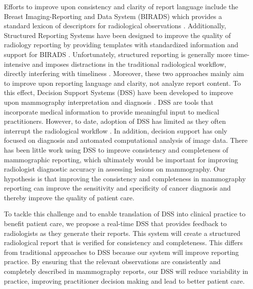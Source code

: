 Efforts to improve upon consistency and clarity of report language include the Breast Imaging-Reporting and Data System (BIRADS) which provides a standard lexicon of descriptors for radiological observations \cite{Liberman:ws}. Additionally, Structured Reporting Systems have been designed to improve the quality of radiology reporting by providing templates with standardized information and support for BIRADS \cite{Reiner:2009ib}. Unfortunately, structured reporting is generally more time-intensive and imposes distractions in the traditional radiological workflow, directly interfering with timeliness \cite{Weiss:2008er}. Moreover, these two approaches mainly aim to improve upon reporting language and clarity, not analyze report content. To this effect, Decision Support Systems (DSS) have been developed to improve upon mammography interpretation and diagnosis \cite{Garg:2005cb, Burnside:2000wl, ElizabethS:2005gc, Rubin:2005jg}. DSS are tools that incorporate medical information to provide meaningful input to medical practitioners. However, to date, adoption of DSS has limited as they often interrupt the radiological workflow \cite{Morgan:2011ct}. In addition, decision support has only focused on diagnosis and automated computational analysis of image data. There has been little work using DSS to improve consistency and completeness of mammographic reporting, which ultimately would be important for improving radiologist diagnostic accuracy in assessing lesions on mammography. Our hypothesis is that improving the consistency and completeness in mammography reporting can improve the sensitivity and specificity of cancer diagnosis and thereby improve the quality of patient care. 

To tackle this challenge and to enable translation of DSS into clinical practice to benefit patient care, we propose a real-time DSS that provides feedback to radiologists as they generate their reports. This system will create a structured radiological report that is verified for consistency and completeness. This differs from traditional approaches to DSS because our system will improve reporting practice. By ensuring that the relevant observations are consistently and completely described in mammography reports, our DSS will reduce variability in practice, improving practitioner decision making and lead to better patient care.
